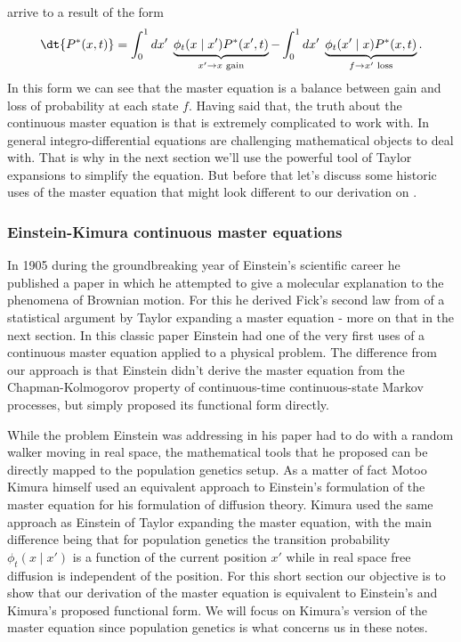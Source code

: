 arrive to a result of the form
\begin{equation}
  \dt{P^*(x, t)} = \int_0^1 dx' \;
  \underbrace{
  \phi_t(x \mid x') P^*(x', t)
  }_{x' \rightarrow x \text{ gain}} -
  \int_0^1 dx' \;
  \underbrace{
  \phi_t(x' \mid x) P^*(x, t)
  }_{f \rightarrow x' \text{ loss}}.
  \label{eq_master_eq_full}
\end{equation}
In this form we can see that the master equation is a balance between gain and
loss of probability at each state $f$. Having said that, the truth about the
continuous master equation is that is extremely complicated to work with. In
general integro-differential equations are challenging mathematical objects to
deal with. That is why in the next section we'll use the powerful tool of
Taylor expansions to simplify the equation. But before that let's discuss some
historic uses of the master equation that might look different to our
derivation
on .

\subsubsection{Einstein-Kimura continuous master equations}

In 1905 during the groundbreaking year of Einstein's scientific career he
published a paper in which he attempted to give a molecular explanation to the
phenomena of Brownian motion. For this he derived Fick's second law from of a
statistical argument by Taylor expanding a master equation - more on that in
the next section. In this classic paper Einstein had one of the very first uses
of a continuous master equation applied to a physical problem. The difference
from our approach is that Einstein didn't derive the master equation from the
Chapman-Kolmogorov property of continuous-time continuous-state Markov
processes, but simply proposed its functional form directly.

While the problem Einstein was addressing in his paper had to do with a random
walker moving in real space, the mathematical tools that he proposed can be
directly mapped to the population genetics setup. As a matter of fact Motoo
Kimura himself used an equivalent approach to Einstein's formulation of the
master equation for his formulation of diffusion theory. Kimura used the same
approach as Einstein of Taylor expanding the master equation, with the main
difference being that for population genetics the transition probability
$\phi_t(x \mid x')$ is a function of the current position $x'$ while in real
space free diffusion is independent of the position. For this short section our
objective is to show that our derivation of the master equation is equivalent
to Einstein's and Kimura's proposed functional form. We will focus on Kimura's
version of the master equation since population genetics is what concerns us in
these notes.

